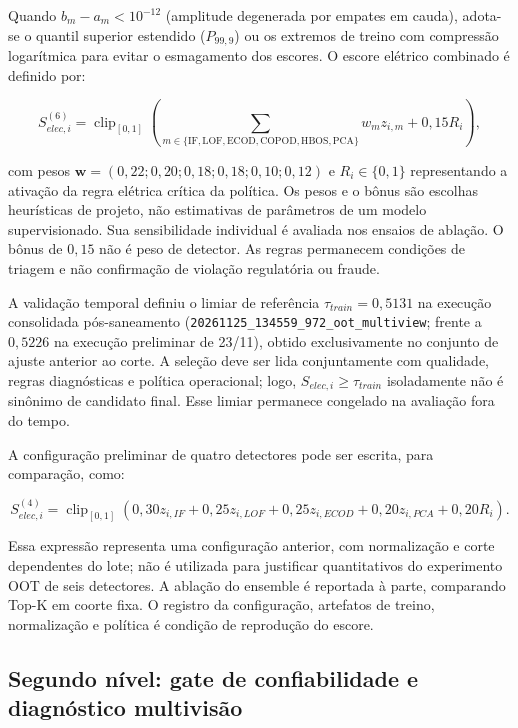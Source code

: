 Quando \(b_m-a_m<10^{-12}\) (amplitude degenerada por empates em cauda), adota-se o quantil superior estendido ($P_{99,9}$) ou os extremos de treino com compressão logarítmica para evitar o esmagamento dos escores. O escore elétrico combinado é definido por:

\[S_{elec,i}^{(6)}=\operatorname{clip}_{[0,1]}\!\left(\sum_{m\in\{\mathrm{IF},\mathrm{LOF},\mathrm{ECOD},\mathrm{COPOD},\mathrm{HBOS},\mathrm{PCA}\}}w_mz_{i,m}+0{,}15R_i\right),\]

com pesos \(\mathbf w=(0{,}22;0{,}20;0{,}18;0{,}18;0{,}10;0{,}12)\) e \(R_i\in\{0,1\}\) representando a ativação da regra elétrica crítica da política. Os pesos e o bônus são escolhas heurísticas de projeto, não estimativas de parâmetros de um modelo supervisionado. Sua sensibilidade individual é avaliada nos ensaios de ablação. O bônus de \(0{,}15\) não é peso de detector. As regras permanecem condições de triagem e não confirmação de violação regulatória ou fraude.

A validação temporal definiu o limiar de referência \(\tau_{train}=0{,}5131\) na execução consolidada pós-saneamento (\texttt{20261125\_134559\_972\_oot\_multiview}; frente a \(0{,}5226\) na execução preliminar de 23/11), obtido exclusivamente no conjunto de ajuste anterior ao corte. A seleção deve ser lida conjuntamente com qualidade, regras diagnósticas e política operacional; logo, \(S_{elec,i}\ge\tau_{train}\) isoladamente não é sinônimo de candidato final. Esse limiar permanece congelado na avaliação fora do tempo.

A configuração preliminar de quatro detectores pode ser escrita, para comparação, como:

\[S_{elec,i}^{(4)}=\operatorname{clip}_{[0,1]}\!\left(0{,}30z_{i,IF}+0{,}25z_{i,LOF}+0{,}25z_{i,ECOD}+0{,}20z_{i,PCA}+0{,}20R_i\right).\]

Essa expressão representa uma configuração anterior, com normalização e corte dependentes do lote; não é utilizada para justificar quantitativos do experimento OOT de seis detectores. A ablação do ensemble é reportada à parte, comparando Top-K em coorte fixa. O registro da configuração, artefatos de treino, normalização e política é condição de reprodução do escore.

\subsection{Segundo nível: gate de confiabilidade e diagnóstico multivisão}\label{segundo-nuxedvel-gate-de-confiabilidade-e-diagnuxf3stico-multivisuxe3o}

